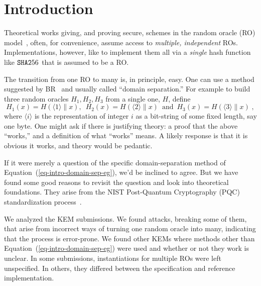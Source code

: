 
\section{Introduction}\label{sec-intro}

Theoretical works giving, and proving secure, schemes in the random oracle (RO) model~\cite{CCS:BelRog93}, often, for convenience, assume access to \textit{multiple, independent} ROs. Implementations, however, like to implement them all via a \textit{single} hash function like $\texttt{SHA{2}}56$ that is assumed to be a RO. 

The transition from one RO to many is, in principle, easy. One can use a method suggested by BR~\cite{CCS:BelRog93} and usually called ``domain separation.'' For example to build three random oracles $H_1,H_2,H_3$ from a single one, $H$, define 
\begin{equation}
H_1(x) = H(\langle 1\rangle\|x), \hspace{6pt} H_2(x) = H(\langle 2\rangle\|x) \hspace{6pt} \mbox{and}\hspace{6pt} H_3(x) = H(\langle 3\rangle\|x)  \;,  \label{eq-intro-domain-sep-eg}
\end{equation}
where $\langle i\rangle$ is the representation of integer $i$ as a bit-string of some fixed length, say one byte. One might ask if there is justifying theory: a proof that the above ``works,'' and a definition of what ``works'' means. A likely response is that it is obvious it works, and theory would be pedantic. 

If it were merely a question of the specific domain-separation method of Equation~(\ref{eq-intro-domain-sep-eg}), we'd be inclined to agree. But we have found some good reasons to revisit the question and look into theoretical foundations. They arise from the NIST Post-Quantum Cryptography (PQC) standardization process~\cite{NIST-PQC}. 

We analyzed the KEM submissions. We found attacks, breaking some of them, that arise from incorrect ways of turning one random oracle into many, indicating that the process is error-prone. We found other KEMs where methods other than Equation~(\ref{eq-intro-domain-sep-eg}) were used and whether or not they work is unclear. In some submissions, instantiations for multiple ROs were left unspecified. In others, they differed between the specification and reference implementation.  

